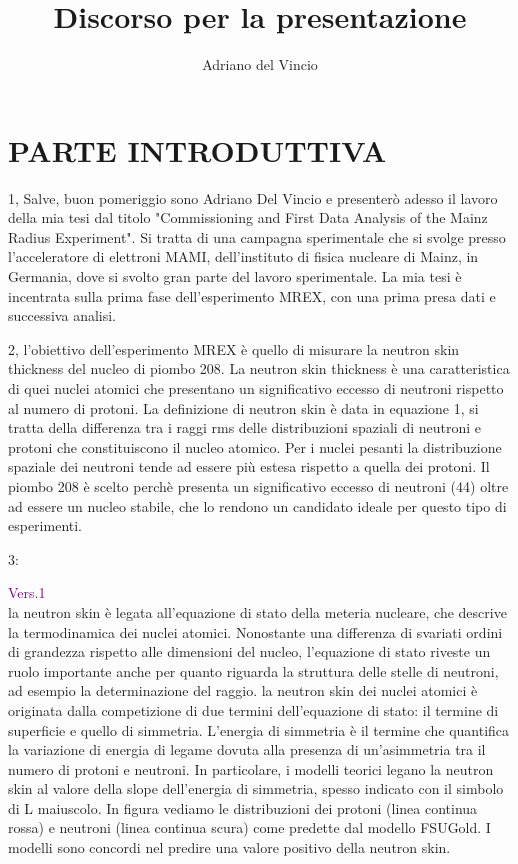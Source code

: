 \documentclass[11pt,a4paper]{article}
\author{Adriano del Vincio}
\title{Discorso per la presentazione}
\begin{document}
\maketitle

\section{PARTE INTRODUTTIVA}
\begin{list}{\textbf{slide}}{}

\item 1, Salve, buon pomeriggio sono Adriano Del Vincio e presenterò adesso il lavoro della mia tesi dal titolo "Commissioning and First Data Analysis of the Mainz Radius Experiment". Si tratta di una campagna sperimentale che si svolge presso l'acceleratore di elettroni MAMI, dell'instituto di fisica nucleare di Mainz, in Germania, dove si svolto gran parte del lavoro sperimentale. La mia tesi è incentrata sulla prima fase dell'esperimento MREX, con una prima presa dati e successiva analisi.

\item 2, l'obiettivo dell'esperimento MREX è quello di misurare la neutron skin thickness del nucleo di piombo 208. La neutron skin thickness è una caratteristica di quei nuclei atomici che presentano un significativo eccesso di neutroni rispetto al numero di protoni. La definizione di neutron skin è data in equazione 1, si tratta della differenza tra i raggi rms delle distribuzioni spaziali di neutroni e protoni che constituiscono il nucleo atomico. Per i nuclei pesanti la distribuzione spaziale dei neutroni tende ad essere più estesa rispetto a quella dei protoni. Il piombo 208 è scelto perchè presenta un significativo eccesso di neutroni (44) oltre ad essere un nucleo stabile, che lo rendono un candidato ideale per questo tipo di esperimenti.

\item 3:

\textcolor{purple}{Vers.1} \\la neutron skin è legata all'equazione di stato della meteria nucleare, che descrive la termodinamica dei nuclei atomici. Nonostante una differenza di svariati ordini di grandezza rispetto alle dimensioni del nucleo, l'equazione di stato riveste un ruolo importante anche per quanto riguarda la struttura delle stelle di neutroni, ad esempio la determinazione del raggio. 
la neutron skin dei nuclei atomici è originata dalla competizione di due termini dell'equazione di stato: il termine di superficie e quello di simmetria. L'energia di simmetria è il termine che quantifica la variazione di energia di legame dovuta alla presenza di un'asimmetria tra il numero di protoni e neutroni. In particolare, i modelli teorici legano la neutron skin al valore della slope dell'energia di simmetria, spesso indicato con il simbolo di L maiuscolo. In figura vediamo le distribuzioni dei protoni (linea continua rossa) e neutroni (linea continua scura) come predette dal modello FSUGold. I modelli sono concordi nel predire una valore positivo della neutron skin.


\end{list}
\end{document}
